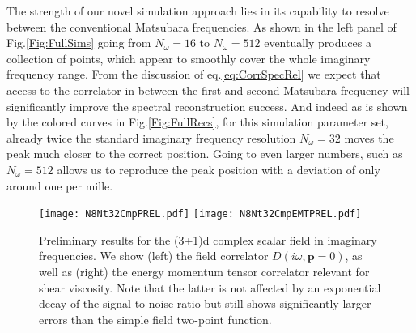 \documentclass[epj]{webofc}
\begin{document}
The strength of our novel simulation approach lies in its capability to resolve between the conventional Matsubara frequencies. As shown in the left panel of Fig.\ref{Fig:FullSims} going from $N_\omega=16$ to $N_\omega=512$ eventually produces a collection of points, which appear to smoothly cover the whole imaginary frequency range.  From the discussion of eq.\eqref{eq:CorrSpecRel} we expect that access to the correlator in between the first and second Matsubara frequency will significantly improve the spectral reconstruction success. And indeed as is shown by the colored curves in Fig.\ref{Fig:FullRecs}, for this simulation parameter set,  already twice the standard imaginary frequency resolution $N_\omega=32$ moves the peak much closer to the correct position. Going to even larger numbers, such as $N_\omega=512$ allows us to reproduce the peak position with a deviation of only around one per mille.

\begin{figure}[b]
\center
\texttt{[image: N8Nt32CmpPREL.pdf]}
\texttt{[image: N8Nt32CmpEMTPREL.pdf]}
\caption{Preliminary results for the (3+1)d complex scalar field in imaginary frequencies. We show (left) the field correlator $D(i\omega, {\mathbf p}=0)$, as well as (right) the energy momentum tensor correlator relevant for shear viscosity. Note that the latter is not affected by an exponential decay of the signal to noise ratio but still shows significantly larger errors than the simple field two-point function.}\label{Fig:ExploreScalar}
\end{figure}
\end{document}
